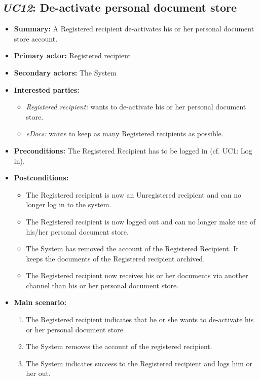 \documentclass[a4paper,10pt]{article}
\begin{document}
\subsection{\emph{UC12}: De-activate personal document store}
\begin{itemize}
	\item \textbf{Summary:} A Registered recipient de-activates his or her personal document store account.
    \item \textbf{Primary actor:} Registered recipient
    \item \textbf{Secondary actors:} The System
    \item \textbf{Interested parties:}
        \begin{itemize}
            \item \textit{Registered recipient:} wants to de-activate his or her personal document store.
            \item \textit{eDocs:} wants to keep as many Registered recipients as possible.
        \end{itemize}

    \item \textbf{Preconditions:} The Registered Recipient has to be logged in (cf. UC1: Log in).

    \item \textbf{Postconditions:}
        \begin{itemize}
            \item The Registered recipient is now an Unregistered recipient and can no longer log in to the system.
            \item The Registered recipient is now logged out and can no longer make use of his/her personal document store.
            \item The System has removed the account of the Registered Recipient. It keeps the documents of the Registered recipient archived.
            \item The Registered recipient now receives his or her documents via another channel than his or her personal document store.
        \end{itemize}
        
    \item \textbf{Main scenario:} 
    \begin{enumerate}
       \item The Registered recipient indicates that he or she wants to de-activate his or her personal document store.
       \item The System removes the account of the registered recipient.
       \item The System indicates success to the Registered recipient and logs him or her out.
    \end{enumerate}
\end{itemize}
\end{document}

